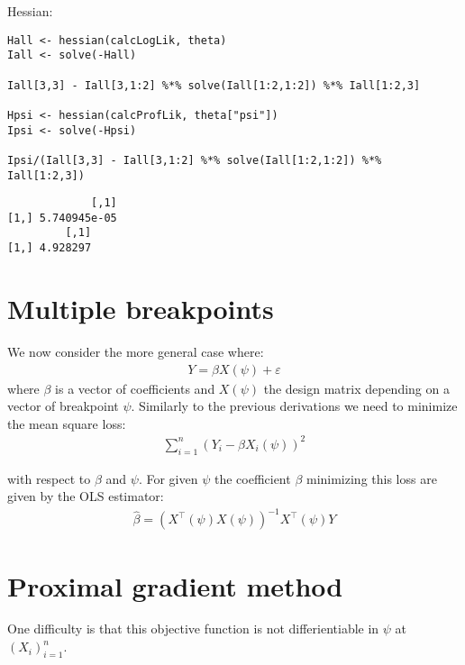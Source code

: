 \documentclass[12pt]{article}
\newcommand\trans[1]{{#1}^\intercal}%
\begin{document}
Hessian:
\lstset{language=r,label= ,caption= ,captionpos=b,numbers=none}
\begin{lstlisting}
Hall <- hessian(calcLogLik, theta)
Iall <- solve(-Hall)

Iall[3,3] - Iall[3,1:2] %*% solve(Iall[1:2,1:2]) %*% Iall[1:2,3]

Hpsi <- hessian(calcProfLik, theta["psi"])
Ipsi <- solve(-Hpsi)

Ipsi/(Iall[3,3] - Iall[3,1:2] %*% solve(Iall[1:2,1:2]) %*% Iall[1:2,3])

\end{lstlisting}

\begin{verbatim}
             [,1]
[1,] 5.740945e-05
         [,1]
[1,] 4.928297
\end{verbatim}


\clearpage

\section{Multiple breakpoints}
\label{sec:orga5dc241}

We now consider the more general case where:
\begin{align*}
Y = \beta X(\psi) + \varepsilon
\end{align*}
where \(\beta\) is a vector of coefficients and \(X(\psi)\) the design
matrix depending on a vector of breakpoint \(\psi\). Similarly to the
previous derivations we need to minimize the mean square loss:
\begin{align*}
\sum_{i=1}^n \left(Y_i - \beta X_i(\psi)\right)^2
\end{align*}

with respect to \(\beta\) and \(\psi\). For given \(\psi\) the
coefficient \(\beta\) minimizing this loss are given by the OLS
estimator:
\begin{align*}
\widehat{\beta} = (\trans{X}(\psi)X(\psi))^{-1}\trans{X}(\psi) Y
\end{align*}

\clearpage

\section{Proximal gradient method}
\label{sec:org8759e44}

One difficulty is that this objective function is not differientiable
in \(\psi\) at \(\left(X_i\right)_{i=1}^n\). 

\bigskip
\end{document}
